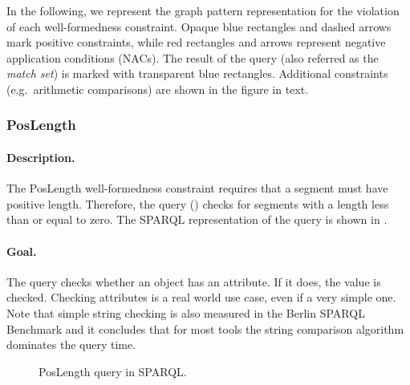 In the following, we represent the graph pattern representation for the violation of each well-formedness constraint. Opaque blue rectangles and dashed arrows mark positive constraints, while red rectangles and arrows represent negative application conditions (NACs). The result of the query (also referred as the \emph{match set}) is marked with transparent blue rectangles. Additional constraints (e.g.\ arithmetic comparisons) are shown in the figure in text.


\subsubsection{PosLength}

\paragraph{Description.} The \textsf{PosLength} well-formedness constraint requires that a segment must have positive length. Therefore, the query () checks for segments with a length less than or equal to zero. The SPARQL representation of the query is shown in .

\paragraph{Goal.} The query checks whether an object has an attribute. If it does, the value is checked. Checking attributes is a real world use case, even if a very simple one. Note that simple string checking is also measured in the Berlin SPARQL Benchmark \cite{BSBM} and it concludes that for most tools the string comparison algorithm dominates the query time.

\begin{figure}[Htb]
\centering
\begin{minipage}{0.5\textwidth}
  { \alignListing
    }
  \caption{\textsf{PosLength} query in SPARQL.}
  \label{lst:poslength-sparql}
\end{minipage}
\end{figure}

% 
% 
% 
% 

